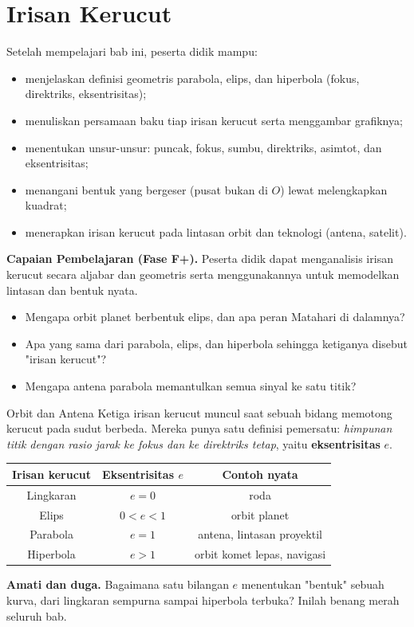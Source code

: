 \documentclass[11pt,a4paper]{report}
\theoremstyle{gaya}
\begin{document}
\chapter{Irisan Kerucut}
\begin{tujuan}
Setelah mempelajari bab ini, peserta didik mampu:
\begin{itemize}[leftmargin=*,topsep=2pt]
  \item menjelaskan definisi geometris parabola, elips, dan hiperbola (fokus, direktriks, eksentrisitas);
  \item menuliskan persamaan baku tiap irisan kerucut serta menggambar grafiknya;
  \item menentukan unsur-unsur: puncak, fokus, sumbu, direktriks, asimtot, dan eksentrisitas;
  \item menangani bentuk yang bergeser (pusat bukan di $O$) lewat melengkapkan kuadrat;
  \item menerapkan irisan kerucut pada lintasan orbit dan teknologi (antena, satelit).
\end{itemize}
\textbf{Capaian Pembelajaran (Fase F+).} Peserta didik dapat menganalisis irisan kerucut secara aljabar dan geometris serta menggunakannya untuk memodelkan lintasan dan bentuk nyata.
\end{tujuan}

\begin{pemantik}
\begin{itemize}[leftmargin=*,topsep=2pt]
  \item Mengapa orbit planet berbentuk elips, dan apa peran Matahari di dalamnya?
  \item Apa yang sama dari parabola, elips, dan hiperbola sehingga ketiganya disebut "irisan kerucut"?
  \item Mengapa antena parabola memantulkan semua sinyal ke satu titik?
\end{itemize}
\end{pemantik}

\begin{studikasus}{Orbit dan Antena}
Ketiga irisan kerucut muncul saat sebuah bidang memotong kerucut pada sudut berbeda. Mereka punya satu definisi pemersatu: \emph{himpunan titik dengan rasio jarak ke fokus dan ke direktriks tetap}, yaitu \textbf{eksentrisitas} $e$.
\begin{center}
\begin{tabular}{c|c|c}
\toprule
Irisan kerucut & Eksentrisitas $e$ & Contoh nyata \\
\midrule
Lingkaran & $e=0$ & roda \\
Elips & $0<e<1$ & orbit planet \\
Parabola & $e=1$ & antena, lintasan proyektil \\
Hiperbola & $e>1$ & orbit komet lepas, navigasi \\
\bottomrule
\end{tabular}
\end{center}
\textbf{Amati dan duga.} Bagaimana satu bilangan $e$ menentukan "bentuk" sebuah kurva, dari lingkaran sempurna sampai hiperbola terbuka? Inilah benang merah seluruh bab.
\end{studikasus}
\end{document}
